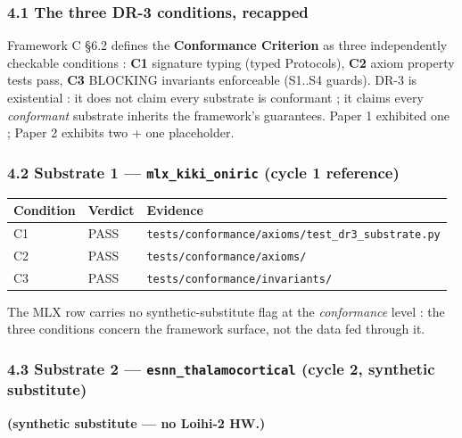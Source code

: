 \documentclass[
]{article}
\newcounter{none} %
\begin{document}
\subsubsection{4.1 The three DR-3 conditions,
recapped}\label{the-three-dr-3-conditions-recapped}

Framework C §6.2 defines the \textbf{Conformance Criterion} as three
independently checkable conditions : \textbf{C1} signature typing (typed
Protocols), \textbf{C2} axiom property tests pass, \textbf{C3} BLOCKING
invariants enforceable (S1..S4 guards). DR-3 is existential : it does
not claim every substrate is conformant ; it claims every
\emph{conformant} substrate inherits the framework's guarantees. Paper 1
exhibited one ; Paper 2 exhibits two + one placeholder.

\subsubsection{\texorpdfstring{4.2 Substrate 1 ---
\texttt{mlx\_kiki\_oniric} (cycle 1
reference)}{4.2 Substrate 1 --- mlx\_kiki\_oniric (cycle 1 reference)}}\label{substrate-1-mlx_kiki_oniric-cycle-1-reference}

{\def\LTcaptype{none} %
\begin{longtable}[]{@{}lll@{}}
\toprule\noalign{}
Condition & Verdict & Evidence \\
\midrule\noalign{}
\endhead
\bottomrule\noalign{}
\endlastfoot
C1 & PASS & \texttt{tests/conformance/axioms/test\_dr3\_substrate.py} \\
C2 & PASS & \texttt{tests/conformance/axioms/} \\
C3 & PASS & \texttt{tests/conformance/invariants/} \\
\end{longtable}
}

The MLX row carries no synthetic-substitute flag at the
\emph{conformance} level : the three conditions concern the framework
surface, not the data fed through it.

\subsubsection{\texorpdfstring{4.3 Substrate 2 ---
\texttt{esnn\_thalamocortical} (cycle 2, synthetic
substitute)}{4.3 Substrate 2 --- esnn\_thalamocortical (cycle 2, synthetic substitute)}}\label{substrate-2-esnn_thalamocortical-cycle-2-synthetic-substitute}

\textbf{(synthetic substitute --- no Loihi-2 HW.)}
\end{document}
